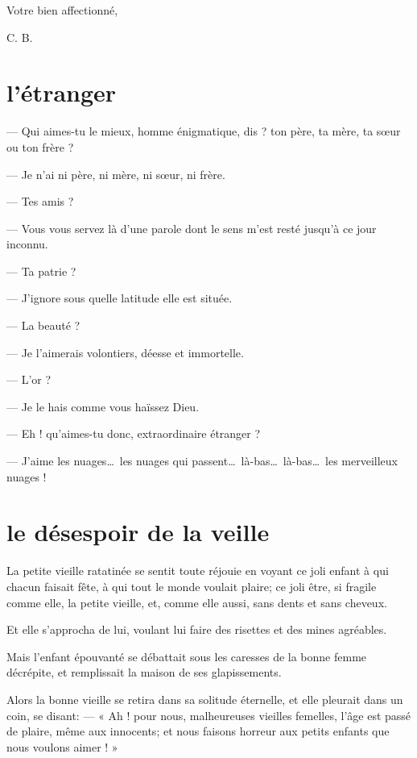 \begin{flushright}
Votre bien affectionné, 

C. B.
\end{flushright}


\setcounter{secnumdepth}{4} %

\quebra\section[L’étranger]{l’étranger}

--- Qui aimes{}-tu le mieux, homme énigmatique, dis ? ton père, ta mère,
ta s\oe ur ou ton frère ?

--- Je n’ai ni père, ni mère, ni s\oe ur, ni frère.

--- Tes amis ?

--- Vous vous servez là d’une parole dont le sens
m’est resté jusqu’à ce jour inconnu.

--- Ta patrie ?

--- J’ignore sous quelle latitude elle est située.

--- La beauté ?

--- Je l’aimerais volontiers, déesse et immortelle.

--- L’or ?

--- Je le hais comme vous haïssez Dieu.

--- Eh ! qu’aimes{}-tu donc, extraordinaire étranger ?

--- J’aime les nuages\ldots\ les nuages qui passent\ldots\ 
là{}-bas\ldots\ là{}-bas\ldots\ les merveilleux nuages !

\quebra\section[Le désespoir de la veille]{le désespoir de la veille}

La petite vieille ratatinée se sentit toute réjouie en voyant ce joli
enfant à qui chacun faisait fête, à qui tout le monde voulait plaire;
ce joli être, si fragile comme elle, la petite vieille, et, comme elle
aussi, sans dents et sans cheveux.

Et elle s’approcha de lui, voulant lui faire des
risettes et des mines agréables.

Mais l’enfant épouvanté se débattait sous les caresses
de la bonne femme décrépite, et remplissait la maison de ses
glapissements.

Alors la bonne vieille se retira dans sa solitude éternelle, et elle
pleurait dans un coin, se disant: --- « Ah ! pour nous, malheureuses
vieilles femelles, l’âge est passé de plaire, même aux
innocents; et nous faisons horreur aux petits enfants que nous voulons
aimer ! »

